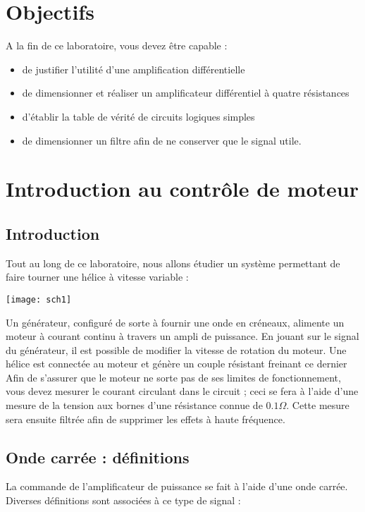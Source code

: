 \documentclass{../template/labo}
\begin{document}
\section{Objectifs}
A la fin de ce laboratoire, vous devez être capable :

\begin{itemize}
\item de justifier l'utilité d'une amplification différentielle
\item de dimensionner et réaliser un amplificateur différentiel à quatre résistances
\item d'établir la table de vérité de circuits logiques simples
\item de dimensionner un filtre afin de ne conserver que le signal utile.
\end{itemize}

\section{Introduction au contrôle de moteur}
\subsection{Introduction}

Tout au long de ce laboratoire, nous allons étudier un système permettant de faire tourner une hélice à
vitesse variable :

\begin{center}
\texttt{[image: sch1]}
\end{center}

Un générateur, configuré de sorte à fournir une onde en créneaux, alimente un moteur à courant
continu à travers un ampli de puissance. En jouant sur le signal du générateur, il est
possible de modifier la vitesse de rotation du moteur.
Une hélice est connectée au moteur et génère un couple résistant freinant ce dernier
Afin de s'assurer que le moteur ne sorte pas de ses limites de fonctionnement, vous devez
mesurer le courant circulant dans le circuit ; ceci se fera à l'aide d'une mesure de la
tension aux bornes d'une résistance connue de $0.1\Omega$. Cette mesure sera ensuite filtrée
afin de supprimer les effets à haute fréquence.

\subsection{Onde carrée : définitions}
La commande de l'amplificateur de puissance se fait à l'aide d'une onde carrée. Diverses
définitions sont associées à ce type de signal :
\end{document}

